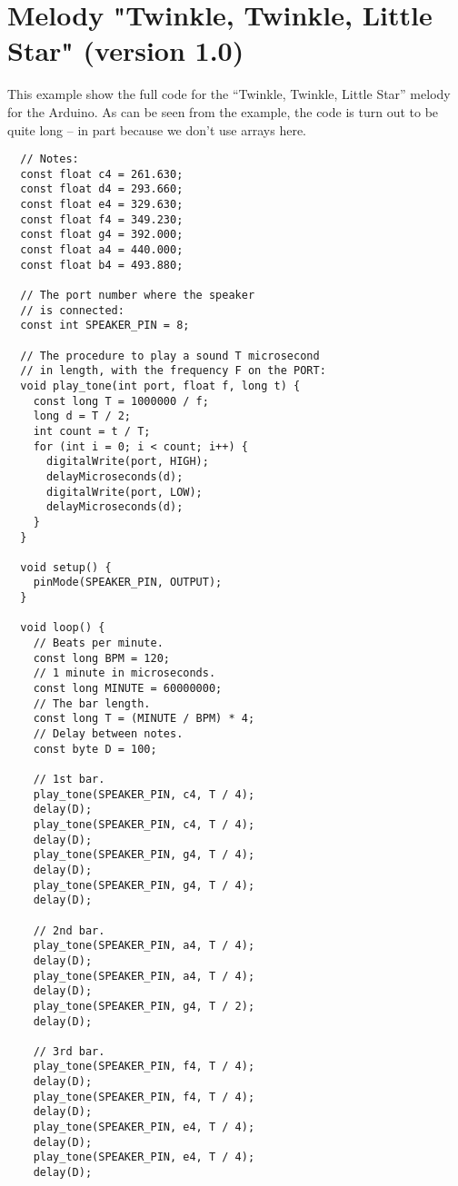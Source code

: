 \documentclass[../sparc.tex]{subfiles}
\begin{document}
\newpage
\chapter{Melody "Twinkle, Twinkle, Little Star" (version 1.0)}
\label{app:twinkle-twinkle-little-star-01}

This example show the full code for the ``Twinkle, Twinkle, Little Star'' melody
for the Arduino.  As can be seen from the example, the code is turn out to be
quite long -- in part because we don't use arrays here.

\begin{verbatim}
  // Notes:
  const float c4 = 261.630;
  const float d4 = 293.660;
  const float e4 = 329.630;
  const float f4 = 349.230;
  const float g4 = 392.000;
  const float a4 = 440.000;
  const float b4 = 493.880;

  // The port number where the speaker
  // is connected:
  const int SPEAKER_PIN = 8;

  // The procedure to play a sound T microsecond
  // in length, with the frequency F on the PORT:
  void play_tone(int port, float f, long t) {
    const long T = 1000000 / f;
    long d = T / 2;
    int count = t / T;
    for (int i = 0; i < count; i++) {
      digitalWrite(port, HIGH);
      delayMicroseconds(d);
      digitalWrite(port, LOW);
      delayMicroseconds(d);
    }
  }

  void setup() {
    pinMode(SPEAKER_PIN, OUTPUT);
  }

  void loop() {
    // Beats per minute.
    const long BPM = 120;
    // 1 minute in microseconds.
    const long MINUTE = 60000000;
    // The bar length.
    const long T = (MINUTE / BPM) * 4;
    // Delay between notes.
    const byte D = 100;

    // 1st bar.
    play_tone(SPEAKER_PIN, c4, T / 4);
    delay(D);
    play_tone(SPEAKER_PIN, c4, T / 4);
    delay(D);
    play_tone(SPEAKER_PIN, g4, T / 4);
    delay(D);
    play_tone(SPEAKER_PIN, g4, T / 4);
    delay(D);

    // 2nd bar.
    play_tone(SPEAKER_PIN, a4, T / 4);
    delay(D);
    play_tone(SPEAKER_PIN, a4, T / 4);
    delay(D);
    play_tone(SPEAKER_PIN, g4, T / 2);
    delay(D);

    // 3rd bar.
    play_tone(SPEAKER_PIN, f4, T / 4);
    delay(D);
    play_tone(SPEAKER_PIN, f4, T / 4);
    delay(D);
    play_tone(SPEAKER_PIN, e4, T / 4);
    delay(D);
    play_tone(SPEAKER_PIN, e4, T / 4);
    delay(D);


\end{verbatim}
\end{document}
